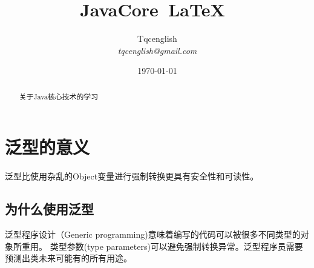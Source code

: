 \documentclass[12pt, a4paper]{article}
\begin{document}
\title{\bf JavaCore~\LaTeX~}
\author{Tqcenglish \\ \it tqcenglish@gmail.com}
\date{\today}
\maketitle
\tableofcontents
\setcounter{tocdepth}{2}
\newpage
\begin{abstract}
    关于Java核心技术的学习
\end{abstract}
\newpage
\section{泛型的意义}
泛型比使用杂乱的Object变量进行强制转换更具有安全性和可读性。
\subsection{为什么使用泛型}
泛型程序设计（Generic programming)意味着编写的代码可以被很多不同类型的对象所重用。
类型参数(type parameters)可以避免强制转换异常。泛型程序员需要预测出类未来可能有的所有用途。
\begin{verbatim}
\end{verbatim}
\end{document}
